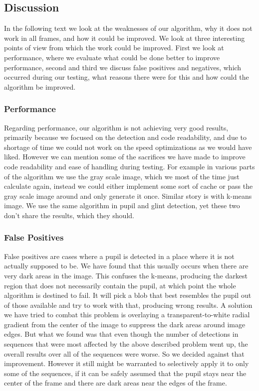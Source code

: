 \subsection{Discussion}
In the following text we look at the weaknesses of our algorithm, why it does not work in all frames, and how it could be improved. We look at three interesting points of view from which the work could be improved. First we look at performance, where we evaluate what could be done better to improve performance, second and third we discuss false positives and negatives, which occurred during our testing, what reasons there were for this and how could the algorithm be improved.

\subsubsection{Performance}
Regarding performance, our algorithm is not achieving very good results, primarily because we focused on the detection and code readability, and due to shortage of time we could not work on the speed optimizations as we would have liked. However we can mention some of the sacrifices we have made to improve code readability and ease of handling during testing. 
For example in various parts of the algorithm we use the gray scale image, which we most of the time just calculate again, instead we could either implement some sort of cache or pass the gray scale image around and only generate it once. Similar story is with k-means image. We use the same algorithm in pupil and glint detection, yet these two don’t share the results, which they should.

\subsubsection{False Positives}
False positives are cases where a pupil is detected in a place where it is not actually supposed to be. We have found that this usually occurs when there are very dark areas in the image. This confuses the k-means, producing the darkest region that does not necessarily contain the pupil, at which point the whole algorithm is destined to fail. It will pick a blob that best resembles the pupil out of those available and try to work with that, producing wrong results. 
A solution we have tried to combat this problem is overlaying a transparent-to-white radial gradient from the center of the image to suppress the dark areas around image edges. But what we found was that even though the number of detections in sequences that were most affected by the above described problem went up, the overall results over all of the sequences were worse. So we decided against that improvement. However it still might be warranted to selectively apply it to only some of the sequences, if it can be safely assumed that the pupil stays near the center of the frame and there are dark areas near the edges of the frame.

